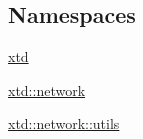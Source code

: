 \subsection*{Namespaces}
\begin{DoxyCompactItemize}
\item 
 \hyperlink{namespacextd}{xtd}
\item 
 \hyperlink{namespacextd_1_1network}{xtd\+::network}
\item 
 \hyperlink{namespacextd_1_1network_1_1utils}{xtd\+::network\+::utils}
\end{DoxyCompactItemize}
